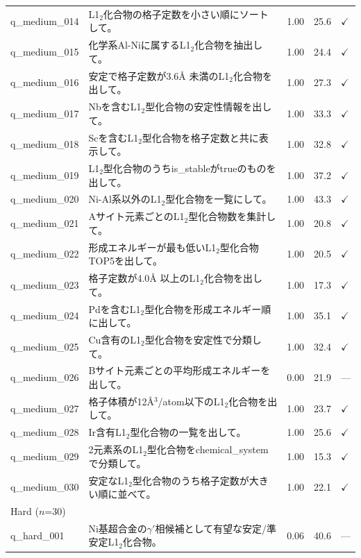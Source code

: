 \begin{longtable}{lp{8.1cm}ccl}
    q\_medium\_014 & L1$_2$化合物の格子定数を小さい順にソートして。 & 1.00 & 25.6 & $\checkmark$ \\
    q\_medium\_015 & 化学系Al-Niに属するL1$_2$化合物を抽出して。 & 1.00 & 24.4 & $\checkmark$ \\
    q\_medium\_016 & 安定で格子定数が3.6\AA{}{} 未満のL1$_2$化合物を出して。 & 1.00 & 27.3 & $\checkmark$ \\
    q\_medium\_017 & Nbを含むL1$_2$型化合物の安定性情報を出して。 & 1.00 & 33.3 & $\checkmark$ \\
    q\_medium\_018 & Scを含むL1$_2$型化合物を格子定数と共に表示して。 & 1.00 & 32.8 & $\checkmark$ \\
    q\_medium\_019 & L1$_2$型化合物のうちis\_stableがtrueのものを出して。 & 1.00 & 37.2 & $\checkmark$ \\
    q\_medium\_020 & Ni-Al系以外のL1$_2$型化合物を一覧にして。 & 1.00 & 43.3 & $\checkmark$ \\
    q\_medium\_021 & Aサイト元素ごとのL1$_2$型化合物数を集計して。 & 1.00 & 20.8 & $\checkmark$ \\
    q\_medium\_022 & 形成エネルギーが最も低いL1$_2$型化合物TOP5を出して。 & 1.00 & 20.5 & $\checkmark$ \\
    q\_medium\_023 & 格子定数が4.0\AA{}{} 以上のL1$_2$化合物を出して。 & 1.00 & 17.3 & $\checkmark$ \\
    q\_medium\_024 & Pdを含むL1$_2$型化合物を形成エネルギー順に出して。 & 1.00 & 35.1 & $\checkmark$ \\
    q\_medium\_025 & Cu含有のL1$_2$型化合物を安定性で分類して。 & 1.00 & 32.4 & $\checkmark$ \\
    q\_medium\_026 & Bサイト元素ごとの平均形成エネルギーを出して。 & 0.00 & 21.9 & --- \\
    q\_medium\_027 & 格子体積が12\AA{}{}$^3$/atom以下のL1$_2$化合物を出して。 & 1.00 & 23.7 & $\checkmark$ \\
    q\_medium\_028 & Ir含有L1$_2$型化合物の一覧を出して。 & 1.00 & 25.6 & $\checkmark$ \\
    q\_medium\_029 & 2元素系のL1$_2$型化合物をchemical\_systemで分類して。 & 1.00 & 15.3 & $\checkmark$ \\
    q\_medium\_030 & 安定なL1$_2$型化合物のうち格子定数が大きい順に並べて。 & 1.00 & 22.1 & $\checkmark$ \\
    \midrule
    \multicolumn{5}{l}{Hard ($n$=30)} \\
    \midrule
    q\_hard\_001 & Ni基超合金の$\gamma'$相候補として有望な安定/準安定L1$_2$化合物。 & 0.06 & 40.6 & --- \\

\end{longtable}
